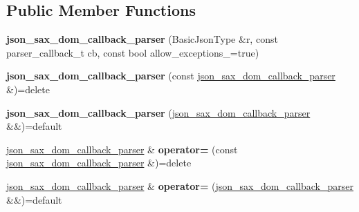 \subsection*{Public Member Functions}
\begin{DoxyCompactItemize}
\item 
\mbox{\label{classnlohmann_1_1detail_1_1json__sax__dom__callback__parser_afec9434e54590f10df51b062973d4daf}} 
{\bfseries json\+\_\+sax\+\_\+dom\+\_\+callback\+\_\+parser} (Basic\+Json\+Type \&r, const parser\+\_\+callback\+\_\+t cb, const bool allow\+\_\+exceptions\+\_\+=true)
\item 
\mbox{\label{classnlohmann_1_1detail_1_1json__sax__dom__callback__parser_a589998730e650a425b1b311e2e9f7f09}} 
{\bfseries json\+\_\+sax\+\_\+dom\+\_\+callback\+\_\+parser} (const \hyperlink{classnlohmann_1_1detail_1_1json__sax__dom__callback__parser}{json\+\_\+sax\+\_\+dom\+\_\+callback\+\_\+parser} \&)=delete
\item 
\mbox{\label{classnlohmann_1_1detail_1_1json__sax__dom__callback__parser_af1ce6c746e3ebadb7994170725fcdbb5}} 
{\bfseries json\+\_\+sax\+\_\+dom\+\_\+callback\+\_\+parser} (\hyperlink{classnlohmann_1_1detail_1_1json__sax__dom__callback__parser}{json\+\_\+sax\+\_\+dom\+\_\+callback\+\_\+parser} \&\&)=default
\item 
\mbox{\label{classnlohmann_1_1detail_1_1json__sax__dom__callback__parser_a5c9603e79a71713f5e8cf12cba837dbb}} 
\hyperlink{classnlohmann_1_1detail_1_1json__sax__dom__callback__parser}{json\+\_\+sax\+\_\+dom\+\_\+callback\+\_\+parser} \& {\bfseries operator=} (const \hyperlink{classnlohmann_1_1detail_1_1json__sax__dom__callback__parser}{json\+\_\+sax\+\_\+dom\+\_\+callback\+\_\+parser} \&)=delete
\item 
\mbox{\label{classnlohmann_1_1detail_1_1json__sax__dom__callback__parser_a60753ffbec958de15de807852e62cde8}} 
\hyperlink{classnlohmann_1_1detail_1_1json__sax__dom__callback__parser}{json\+\_\+sax\+\_\+dom\+\_\+callback\+\_\+parser} \& {\bfseries operator=} (\hyperlink{classnlohmann_1_1detail_1_1json__sax__dom__callback__parser}{json\+\_\+sax\+\_\+dom\+\_\+callback\+\_\+parser} \&\&)=default

\end{DoxyCompactItemize}
